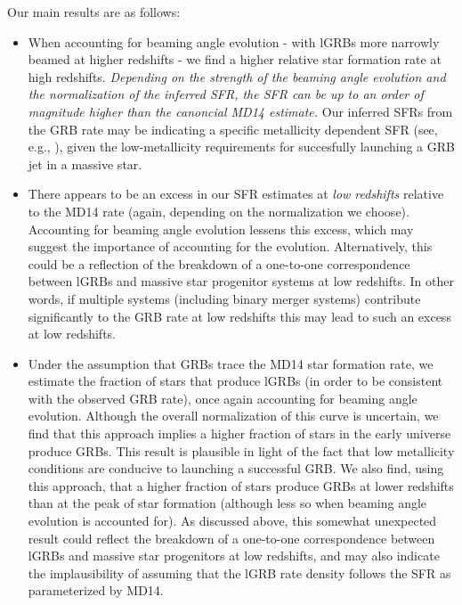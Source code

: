 \documentclass[fleqn,usenatbib,useAMS]{mnras}
\begin{document}
\noindent Our main results are as follows:
\begin{itemize}
    \item When accounting for beaming angle evolution - with lGRBs more narrowly beamed at higher redshifts - we find a higher relative star formation rate at high redshifts.  {\em Depending on the strength of the beaming angle evolution and the normalization of the inferred SFR, the SFR can be up to an order of magnitude higher than the canoncial MD14 estimate.}  Our inferred SFRs from the GRB rate may be indicating a specific metallicity dependent SFR (see, e.g., \cite{Bjor19,Chrus2020}), given the low-metallicity requirements for succesfully launching a GRB jet in a massive star. \\
   
    \item There appears to be an excess in our SFR estimates at {\em low redshifts} relative to the MD14 rate (again, depending on the normalization we choose).  Accounting for beaming angle evolution lessens this excess, which may suggest the importance of accounting for the evolution. Alternatively, this could be a reflection of the breakdown of a one-to-one correspondence between lGRBs and massive star progenitor systems at low redshifts.  In other words, if multiple systems (including binary merger systems) contribute significantly to the GRB rate at low redshifts this may lead to such an excess at low redshifts.   \\
    
    \item Under the assumption that GRBs trace the MD14 star formation rate, we estimate the fraction of stars that produce lGRBs (in order to be consistent with the observed GRB rate), once again accounting for beaming angle evolution.  Although the overall normalization of this curve is uncertain, we find that this approach implies a higher fraction of stars in the early universe produce GRBs.  This result is plausible in light of the fact that low metallicity conditions are conducive to launching a successful GRB. We also find, using this approach, that a higher fraction of stars produce GRBs at lower redshifts than at the peak of star formation (although less so when beaming angle evolution is accounted for).  As discussed above, this somewhat unexpected result could reflect the breakdown of a one-to-one correspondence between lGRBs and massive star progenitors at low redshifts, and may also indicate the implausibility of assuming that the lGRB rate density follows the SFR as parameterized by MD14.
\end{itemize}
\end{document}
